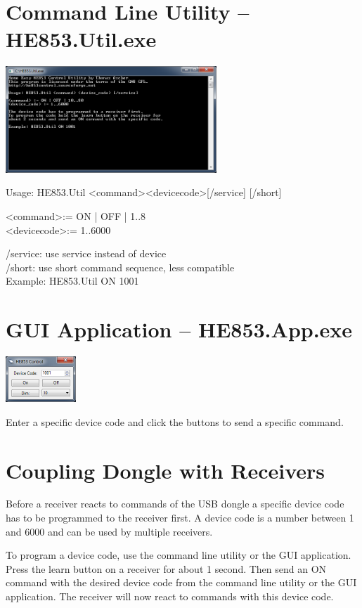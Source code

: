 \documentclass[
a4paper,
oneside,
halfparskip*,
normalheadings,
]
{scrbook}
\begin{document}
\section{Command Line Utility -- HE853.Util.exe}

\includegraphics[width=300px]{cmd.png}

Usage: HE853.Util \textless command\textgreater \textless device\textunderscore code\textgreater [/service] [/short]

\textless command\textgreater := ON | OFF | 1..8 \\
\textless device\textunderscore code\textgreater := 1..6000

/service: use service instead of device \\
/short: use short command sequence, less compatible \\

Example: HE853.Util ON 1001

\section{GUI Application -- HE853.App.exe}

\includegraphics[width=100px]{gui.png}

Enter a specific device code and click the buttons to send a specific command.

\section{Coupling Dongle with Receivers}

Before a receiver reacts to commands of the USB dongle a specific device code has to be
programmed to the receiver first. A device code is a number between 1 and 6000 and can
be used by multiple receivers.

To program a device code, use the command line utility or the GUI application. Press the
learn button on a receiver for about 1 second. Then send an ON command with the desired
device code from the command line utility or the GUI application. The receiver will now
react to commands with this device code.
\end{document}
